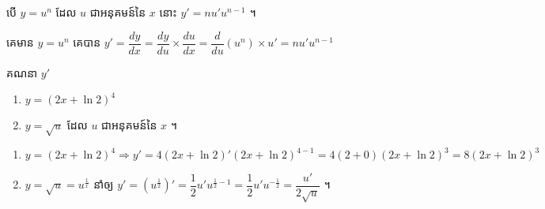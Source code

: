\documentclass[a4paper,12pt]{article}
\begin{document}
\begin{general}
	បើ $y=u^n$ ដែល $u$ ជាអនុគមន៍នៃ $x$ នោះ $y'=n u' u^{n-1}$  ។
\end{general}
\solution
គេមាន $y=u^n$ គេបាន $y'=\dfrac{dy}{dx}=\dfrac{dy}{du}\times \dfrac{du}{dx}=\dfrac{d}{du}(u^n)\times u'=nu'u^{n-1}$
\begin{example}
	គណនា $y'$
	\begin{multicols}{2}
		\begin{enumerate}
			\item $y=(2x+\ln 2)^4$
			\item $y=\sqrt{u}$ ដែល $u$ ជាអនុគមន៍នៃ $x$ ។
		\end{enumerate}
	\end{multicols}
\end{example}
\answer
\begin{enumerate}
	\item $y=(2x+\ln 2)^4\Rightarrow y'=4(2x+\ln 2)'(2x+\ln 2)^{4-1}=4(2+0)(2x+\ln 2)^3=8(2x+\ln 2)^3$
	\item $y=\sqrt{u}=u^{\frac{1}{x}}$ នាំឲ្យ $y'=(u^{\frac{1}{2}})'=\dfrac{1}{2}u'u^{\frac{1}{2}-1}=\dfrac{1}{2}u'u^{-\frac{1}{2}}=\dfrac{u'}{2\sqrt{u}}$ ។
\end{enumerate}
\end{document}
